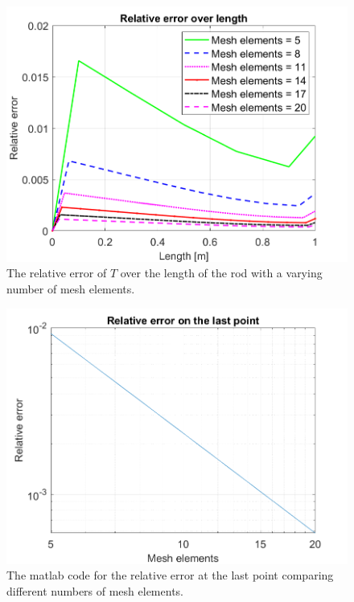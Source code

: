 \begin{minipage}[H]{.45\textwidth}
\begin{figure}[H]
    \centering
    \includegraphics[width=\textwidth]{figures/errLen.png}
    \caption{The relative error of $T$ over the length of the rod with a varying number of mesh elements.}
    \label{fig:errLen}
\end{figure}
\end{minipage}
\hspace{1cm}
\begin{minipage}[H]{.45\textwidth}
\begin{figure}[H]
    \centering
    \includegraphics[width=\textwidth]{figures/errElems.png}
    \caption{The matlab code for the relative error at the last point comparing different numbers of mesh elements.}
    \label{fig:errElems}
\end{figure}
\end{minipage}




